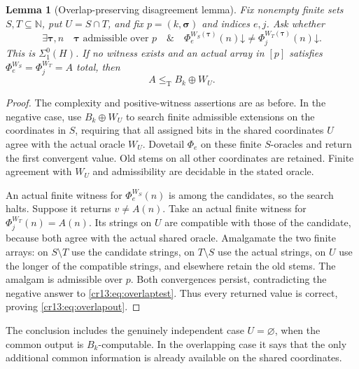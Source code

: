 \documentclass[11pt,letterpaper]{article}
\newtheorem{lemma}[theorem]{Lemma}
\theoremstyle{definition}
\theoremstyle{remark}\newtheorem{remark}[theorem]{Remark}
\numberwithin{equation}{section}
\newcommand{\N}{\mathbb N}
\newcommand{\leT}{\leq_{\mathrm T}}
\newcommand{\hal}{\mathord\downarrow}
\begin{document}
\begin{lemma}[Overlap-preserving disagreement lemma]\label{cr13:lem:overlap}
Fix nonempty finite sets $S,T\subseteq\N$, put $U=S\cap T$, and fix $p=(k,\boldsymbol\sigma)$ and indices $e,j$. Ask whether
\begin{equation}\label{cr13:eq:overlaptest}
 \exists\boldsymbol\tau,n\quad
 \boldsymbol\tau\text{ admissible over }p\quad\&\quad
 \Phi_e^{W_S(\boldsymbol\tau)}(n)\hal
            \ne\Phi_j^{W_T(\boldsymbol\tau)}(n)\hal.
\end{equation}
This is $\Sigma^0_1(H)$. If no witness exists and an actual array in $[p]$ satisfies $\Phi_e^{W_S}=\Phi_j^{W_T}=A$ total, then
\begin{equation}\label{cr13:eq:overlapout}
                             A\leT B_k\oplus W_U.
\end{equation}
\end{lemma}
\begin{proof}
The complexity and positive-witness assertions are as before. In the negative case, use $B_k\oplus W_U$ to search finite admissible extensions on the coordinates in $S$, requiring that all assigned bits in the shared coordinates $U$ agree with the actual oracle $W_U$. Dovetail $\Phi_e$ on these finite $S$-oracles and return the first convergent value. Old stems on all other coordinates are retained. Finite agreement with $W_U$ and admissibility are decidable in the stated oracle.

An actual finite witness for $\Phi_e^{W_S}(n)$ is among the candidates, so the search halts. Suppose it returns $v\ne A(n)$. Take an actual finite witness for $\Phi_j^{W_T}(n)=A(n)$. Its strings on $U$ are compatible with those of the candidate, because both agree with the actual shared oracle. Amalgamate the two finite arrays: on $S\setminus T$ use the candidate strings, on $T\setminus S$ use the actual strings, on $U$ use the longer of the compatible strings, and elsewhere retain the old stems. The amalgam is admissible over $p$. Both convergences persist, contradicting the negative answer to \eqref{cr13:eq:overlaptest}. Thus every returned value is correct, proving \eqref{cr13:eq:overlapout}.
\end{proof}
The conclusion includes the genuinely independent case $U=\varnothing$, when the common output is $B_k$-computable. In the overlapping case it says that the only additional common information is already available on the shared coordinates.
\end{document}
